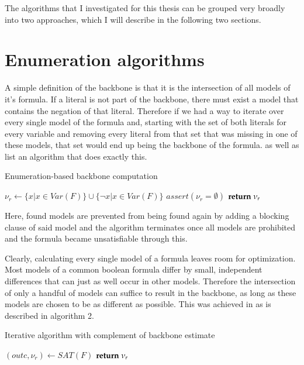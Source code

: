 The algorithms that I investigated for this thesis can be grouped very broadly into two approaches, which I will describe in the following two sections.


\section{Enumeration algorithms}
A simple definition of the backbone is that it is the intersection of all models of it's formula. If a literal is not part of the backbone, there must exist a model that contains the negation of that literal. Therefore if we had a way to iterate over every single model of the formula and, starting with the set of both literals for every variable and removing every literal from that set that was missing in one of these models, that set would end up being the backbone of the formula. \cite{mjl10} as well as \cite{mjl15} list an algorithm that does exactly this. 

\begin{algorithm} %
\caption{{\sc Enumeration-based backbone computation}}
\DontPrintSemicolon
{}
$\nu_r \gets \{ x | x \in Var(F) \} \cup \{ \neg x | x \in Var(F) \}$\;
$assert(\nu_r = \emptyset)$\;
$\Return\; \nu_r$\;
\end{algorithm}

Here, found models are prevented from being found again by adding a blocking clause of said model and the algorithm terminates once all models are prohibited and the formula became unsatisfiable through this.

Clearly, calculating every single model of a formula leaves room for optimization. Most models of a common boolean formula differ by small, independent differences that can just as well occur in other models. Therefore the intersection of only a handful of models can suffice to result in the backbone, as long as these models are chosen to be as different as possible. This was achieved in \cite{mjl15} as is described in algorithm 2.

\begin{algorithm}
\caption{{\sc Iterative algorithm with complement of backbone estimate}}
\DontPrintSemicolon
{}
$(outc,\nu_r) \gets SAT(F)$\;
$\Return \; \nu_r$\;
\end{algorithm}

